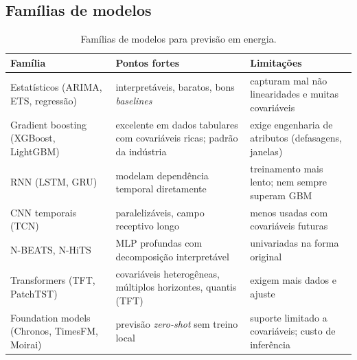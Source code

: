 \documentclass[11pt,a4paper]{article}
\begin{document}
\subsection{Famílias de modelos}

\begin{table}[h]
\centering
\small
\begin{tabularx}{\textwidth}{l L L}
\toprule
\textbf{Família} & \textbf{Pontos fortes} & \textbf{Limitações} \\
\midrule
Estatísticos (ARIMA, ETS, regressão) & interpretáveis, baratos, bons
  \textit{baselines} & capturam mal não linearidades e muitas covariáveis \\
Gradient boosting (XGBoost, LightGBM) & excelente em dados tabulares com
  covariáveis ricas; padrão da indústria & exige engenharia de atributos
  (defasagens, janelas) \\
RNN (LSTM, GRU) & modelam dependência temporal diretamente & treinamento
  mais lento; nem sempre superam GBM \\
CNN temporais (TCN) & paralelizáveis, campo receptivo longo & menos usadas
  com covariáveis futuras \\
N-BEATS, N-HiTS & MLP profundas com decomposição interpretável & univariadas
  na forma original \\
Transformers (TFT, PatchTST) & covariáveis heterogêneas, múltiplos
  horizontes, quantis (TFT)~\cite{tft} & exigem mais dados e ajuste \\
Foundation models (Chronos, TimesFM, Moirai) & previsão \textit{zero-shot}
  sem treino local~\cite{chronos,timesfm} & suporte limitado a covariáveis;
  custo de inferência \\
\bottomrule
\end{tabularx}
\caption{Famílias de modelos para previsão em energia.}
\end{table}
\end{document}
